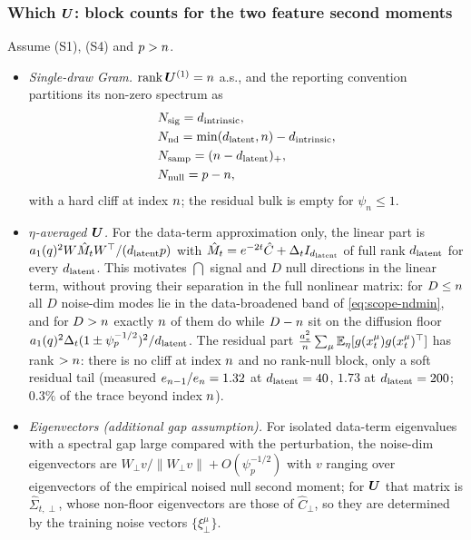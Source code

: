 \subsubsection{Which $\bm{U}$: block counts for the two feature second moments}

\begin{remark}\label{prop:scope-counts}
Assume (S1), (S4) and $p>n$.
\begin{itemize}
\item[(a)] \emph{Single-draw Gram.} $\operatorname{rank}\bm{U}^{(1)}=n$ a.s., and the reporting convention partitions its non-zero spectrum as
\begin{equation}\label{eq:scope-counts}
\begin{aligned}
&N_{\rm sig}=d_{\mathrm{intrinsic}},\\ & N_{\rm nd}=\min(d_{\mathrm{latent}},n)-d_{\mathrm{intrinsic}},\\ & N_{\rm samp}=(n-d_{\mathrm{latent}})_+,\\ & N_{\rm null}=p-n ,
\end{aligned}
\end{equation}
with a hard cliff at index $n$; the residual bulk is empty for $\psi_n\le1$.
\item[(b)] \emph{$\eta$-averaged $\bm{U}$.} For the data-term approximation only, the linear part is $a_1(q)^2W\hat M_tW^\top/(d_{\mathrm{latent}}p)$ with $\hat M_t=e^{-2t}\hat C+\Delta_tI_{d_{\mathrm{latent}}}$ of full rank $d_{\mathrm{latent}}$ for every $d_{\mathrm{latent}}$. This motivates $\dint$ signal and $D$ null directions in the linear term, without proving their separation in the full nonlinear matrix: for $D\le n$ all $D$ noise-dim modes lie in the data-broadened band of \eqref{eq:scope-ndmin}, and for $D>n$ exactly $n$ of them do while $D-n$ sit on the diffusion floor $a_1(q)^2\Delta_t(1\pm\psi_p^{-1/2})^2/d_{\mathrm{latent}}$. The residual part $\frac{a_*^2}{n}\sum_\mu\mathbb{E}_\eta[g(x_t^\mu)g(x_t^\mu)^\top]$ has rank $>n$: there is no cliff at index $n$ and no rank-null block, only a soft residual tail (measured $e_{n-1}/e_{n}=1.32$ at $d_{\mathrm{latent}}=40$, $1.73$ at $d_{\mathrm{latent}}=200$; $0.3\%$ of the trace beyond index $n$).
\item[(c)] \emph{Eigenvectors (additional gap assumption).} For isolated data-term eigenvalues with a spectral gap large compared with the perturbation, the noise-dim eigenvectors are $W_\perp v/\|W_\perp v\|+O(\psi_p^{-1/2})$ with $v$ ranging over eigenvectors of the empirical noised null second moment; for $\bm{U}$ that matrix is $\hat\Sigma_{t,\perp}$, whose non-floor eigenvectors are those of $\hat C_\perp$, so they are determined by the training noise vectors $\{\xi^\mu_\perp\}$.
\end{itemize}
\end{remark}
